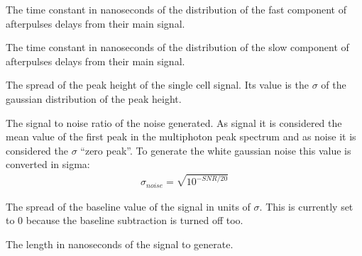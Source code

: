 \documentclass[letterpaper,10pt,english]{sphinxmanual}
\begin{document}
\begin{fulllineitems}
The time constant in nanoseconds of the distribution of the fast component of afterpulses delays from their main signal.

\end{fulllineitems}



\begin{fulllineitems}
The time constant in nanoseconds of the distribution of the slow component of afterpulses delays from their main signal.

\end{fulllineitems}



\begin{fulllineitems}
The spread of the peak height of the single cell signal. Its value is the \(\sigma\) of the gaussian distribution of the peak height.

\end{fulllineitems}



\begin{fulllineitems}
The signal to noise ratio of the noise generated. As signal it is considered the mean value of the first peak in the multi\sphinxhyphen{}photon peak spectrum and as noise it is considered the \(\sigma\) “zero peak”.
To generate the white gaussian noise this value is converted in sigma:
\begin{equation*}
\begin{split}\sigma_{noise} = \sqrt{10^{-SNR/20}}\end{split}
\end{equation*}
\end{fulllineitems}



\begin{fulllineitems}
The spread of the baseline value of the signal in units of \(\sigma\). This is currently set to 0 because the baseline subtraction is turned off too.

\end{fulllineitems}



\begin{fulllineitems}
The length in nanoseconds of the signal to generate.

\end{fulllineitems}
\end{document}
